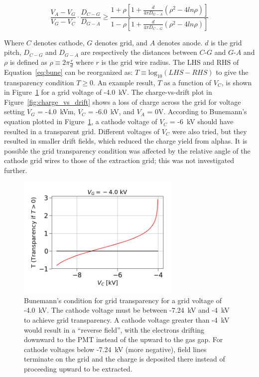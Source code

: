 \begin{equation}
\label{eq:bune}
\frac{V_{A} - V_{G}}{V_{G} - V_{C}} \cdot \frac{D_{C-G}}{D_{G-A}} \geqslant \frac{1 + \rho [1 + \frac{d}{4\pi D_{G-A}} (\rho^{2} - 4 ln\rho) ]} {1 - \rho [1 + \frac{d}{4\pi D_{C-G}} (\rho^{2} - 4 ln\rho) ]}
\end{equation}

Where $C$ denotes cathode, $G$ denotes grid, and $A$ denotes anode. $d$ is the grid pitch, $D_{C-G}$ and $D_{G-A}$ are respectively the distances between $C$-$G$ and $G$-$A$ and $\rho$ is defined as $\rho \equiv 2\pi \frac{r}{d}$ where $r$ is the grid wire radius. The \ac{LHS} and \ac{RHS} of Equation~\ref{eq:bune} can be reorganized as: $T \equiv \mathrm{log}_{10}(LHS - RHS)$ to give the transparency condition $T \geqslant 0$. An example result, $T$ as a function of $V_{C}$, is shown in Figure~\ref{fig:bune} for a grid voltage of -4.0~kV. The charge-vs-drift plot in Figure~\ref{fig:charge_vs_drift} shows a loss of charge across the grid for voltage setting $V_{G}$ = -4.0~kVm, $V_{C}$ = -6.0~kV, and $V_{A}$ = 0V. According to Bunemann's equation plotted in Figure~\ref{fig:bune}, a cathode voltage of $V_{C}$ = -6~kV should have resulted in a transparent grid. Different voltages of $V_{C}$ were also tried, but they resulted in smaller drift fields, which reduced the charge yield from alphas. It is possible the grid transparency condition was affected by the relative angle of the cathode grid wires to those of the extraction grid; this was not investigated further.

\begin{figure}[htbp]
\begin{center}
\includegraphics[width=0.7\textwidth]{figures/etrains/bune.png}
\caption{Bunemann's condition for grid transparency for a grid voltage of -4.0~kV. The cathode voltage must be between -7.24~kV and -4~kV to achieve grid transparency. A cathode voltage greater than -4~kV would result in a ``reverse field'', with the electrons drifting downward to the \acs{PMT} instead of the upward to the gas gap. For cathode voltages below -7.24~kV (more negative), field lines terminate on the grid and the charge is deposited there instead of proceeding upward to be extracted.}
\label{fig:bune}
\end{center}
\end{figure}

